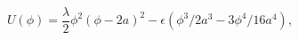 \begin{equation}U(\phi)=\frac{\lambda}{2}\phi^2(\phi-2a)^2-
\epsilon(\phi^3/2a^3-3\phi^4/16a^4),\label{po}\end{equation} 
